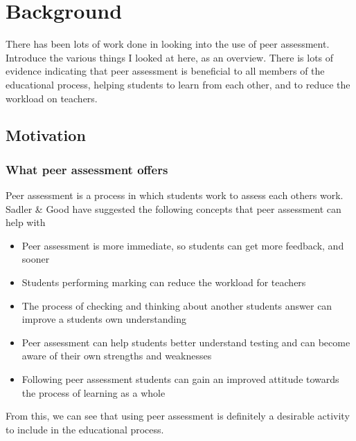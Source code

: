\documentclass[a4paper,11pt]{report}
\begin{document}
\chapter{Background}
There has been lots of work done in looking into the use of peer assessment. Introduce the various things I looked at here, as an overview. There is lots of evidence indicating that peer assessment is beneficial to all members of the educational process, helping students to learn from each other, and to reduce the workload on teachers.
\section{Motivation}
\subsection{What peer assessment offers}
Peer assessment is a process in which students work to assess each others work. Sadler \& Good \cite{sadler_impact_2006} have suggested the following concepts that peer assessment can help with
\begin{itemize}
 \item Peer assessment is more immediate, so students can get more feedback, and sooner
 \item Students performing marking can reduce the workload for teachers
 \item The process of checking and thinking about another students answer can improve a students own understanding
 \item Peer assessment can help students better understand testing and can become aware of their own strengths and weaknesses
 \item Following peer assessment students can gain an improved attitude towards the process of learning as a whole
\end{itemize}
From this, we can see that using peer assessment is definitely a desirable activity to include in the educational process.\par
\end{document}
